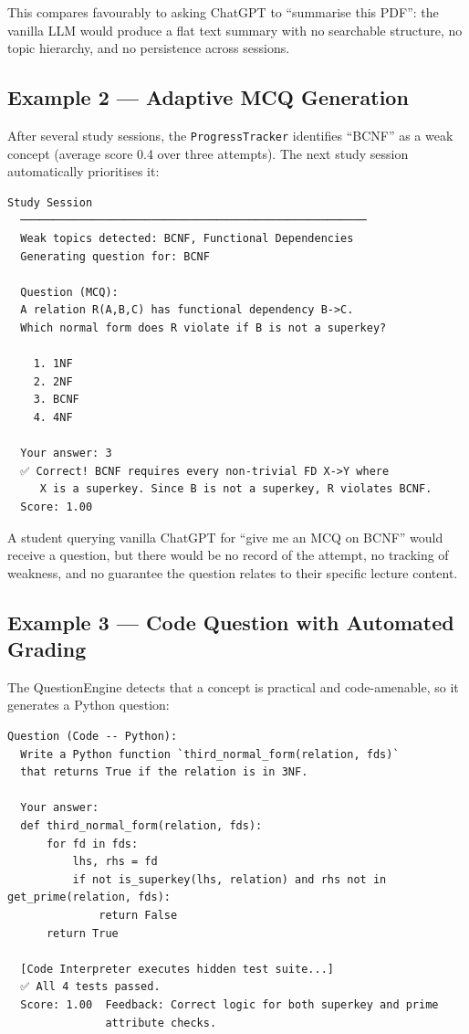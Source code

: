 \documentclass[12pt,a4paper]{article}
\begin{document}
This compares favourably to asking ChatGPT to ``summarise this PDF'': the
vanilla LLM would produce a flat text summary with no searchable structure,
no topic hierarchy, and no persistence across sessions.

\subsection{Example 2 --- Adaptive MCQ Generation}

After several study sessions, the \texttt{ProgressTracker} identifies
``BCNF'' as a weak concept (average score 0.4 over three attempts). The
next study session automatically prioritises it:

\begin{lstlisting}[language={},numbers=none]
  Study Session
  ─────────────────────────────────────────────────────
  Weak topics detected: BCNF, Functional Dependencies
  Generating question for: BCNF

  Question (MCQ):
  A relation R(A,B,C) has functional dependency B->C.
  Which normal form does R violate if B is not a superkey?

    1. 1NF
    2. 2NF
    3. BCNF
    4. 4NF

  Your answer: 3
  ✅ Correct! BCNF requires every non-trivial FD X->Y where
     X is a superkey. Since B is not a superkey, R violates BCNF.
  Score: 1.00
\end{lstlisting}

A student querying vanilla ChatGPT for ``give me an MCQ on BCNF'' would
receive a question, but there would be no record of the attempt, no tracking
of weakness, and no guarantee the question relates to their specific lecture
content.

\subsection{Example 3 --- Code Question with Automated Grading}

The QuestionEngine detects that a concept is practical and code-amenable, so
it generates a Python question:

\begin{lstlisting}[language={},numbers=none]
  Question (Code -- Python):
  Write a Python function `third_normal_form(relation, fds)`
  that returns True if the relation is in 3NF.

  Your answer:
  def third_normal_form(relation, fds):
      for fd in fds:
          lhs, rhs = fd
          if not is_superkey(lhs, relation) and rhs not in get_prime(relation, fds):
              return False
      return True

  [Code Interpreter executes hidden test suite...]
  ✅ All 4 tests passed.
  Score: 1.00  Feedback: Correct logic for both superkey and prime
               attribute checks.
\end{lstlisting}
\end{document}

